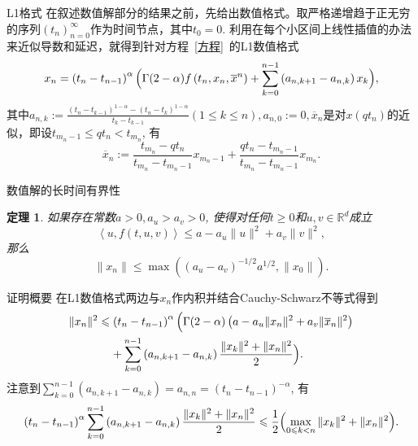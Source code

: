 \documentclass[aspectratio=16 9, 10pt, notheorems]{ctexbeamer}
\let\oldeqref\eqref
\renewcommand{\eqref}[1]{~\oldeqref{#1}~}
\newcommand{\mainEquation}{方程\eqref{方程}}
\newcommand{\relphantom}[1]{\mathrel{\phantom{#1}}\negmedspace {}}
\newcommand{\realset}{\mathbb{R}}
\newtheorem{theorem}{定理}
\begin{document}
\begin{frame}{L1格式}
    在叙述数值解部分的结果之前，先给出数值格式。取严格递增趋于正无穷的序列$\left(t_n\right)_{n=0}^\infty$作为时间节点，其中$t_0=0$. 利用在每个小区间上线性插值的办法来近似导数和延迟，就得到针对\mainEquation 的L1数值格式
    \begin{equation*}\label{L1格式}
        x_n=\left(t_n-t_{n-1}\right)^\alpha \Bigl(\Gamma(2-\alpha) f\left(t_n,x_n,\overline{x}^n\right) + \sum_{k=0}^{n-1} \left(a_{n,k+1}-a_{n,k}\right) x_k\Bigr),
    \end{equation*}
    其中$a_{n,k}:=\frac{\left(t_n-t_{k-1}\right)^{1-\alpha}-\left(t_n-t_{k}\right)^{1-\alpha}}{t_k-t_{k-1}} (1\leqslant k\leqslant n),a_{n,0}:=0,\overline x_n$是对$x(qt_n)$的近似，即设$t_{m_n-1}\leqslant qt_n<t_{m_n}$, 有
    \begin{equation*}
        \overline x_n:=\frac{t_{m_n}-qt_n}{t_{m_n}-t_{m_n-1}}x_{m_n-1}+\frac{qt_n-t_{m_n-1}}{t_{m_n}-t_{m_n-1}}x_{m_n}.
    \end{equation*}
\end{frame}
\begin{frame}{数值解的长时间有界性}
    \begin{theorem}\label{dissipativity}
        如果存在常数$a>0,a_u>a_v>0$, 使得对任何$t\geqslant 0$和$u,v\in \realset^d$成立
        \begin{equation*}
            \left<u,f(t,u,v)\right>\leqslant a-a_u \|u\|^2+a_v \|v\|^2,
        \end{equation*}
        那么
        \begin{equation*}\label{耗散性结果}
            \|x_n\|\leqslant \max\left(\left(a_u-a_v\right)^{-1/2}a^{1/2},\|x_0\|\right).
        \end{equation*}
    \end{theorem}
\end{frame}
\begin{frame}{证明概要}
    在L1数值格式两边与$x_n$作内积并结合Cauchy-Schwarz不等式得到
    \begin{equation}\label{耗散性-内积放缩}
        \begin{aligned}
            \|x_n\|^2&\leqslant \left(t_n-t_{n-1}\right)^\alpha \Bigl( \Gamma(2-\alpha) \left(a-a_u \|x_n\|^2 + a_v \|\overline x_n\|^2\right)
            \\ &\relphantom{\leqslant} + \sum_{k=0}^{n-1} \left(a_{n,k+1}-a_{n,k}\right) \frac{\|x_k\|^2+\|x_n\|^2}{2}\Bigr).
        \end{aligned}
    \end{equation}
    注意到$\sum_{k=0}^{n-1} \left(a_{n,k+1}-a_{n,k}\right)=a_{n,n}=\left(t_n-t_{n-1}\right)^{-\alpha}$, 有
    \begin{equation}\label{耗散性-求和}
        \left(t_n-t_{n-1}\right)^\alpha \sum_{k=0}^{n-1} \left(a_{n,k+1}-a_{n,k}\right) \frac{\|x_k\|^2+\|x_n\|^2}{2}\leqslant\frac{1}{2}\Bigl(\max_{0\leqslant k<n} \|x_k\|^2 + \|x_n\|^2\Bigr).
    \end{equation}
\end{frame}
\end{document}
